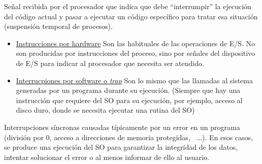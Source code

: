 \begin{definicion} [Interrupciones]
    Señal recibida por el procesador que indica que debe ``interrumpir'' la ejecución del código actual y pasar a ejecutar un código específico para tratar esa situación (suspensión temporal de procesos).
    \begin{itemize}
         \item \underline{Instrucciones por hardware} Son las habituales de las operaciones de E/S. No son producidas por instrucciones del proceso, sino por señales del dispositivo de E/S para indicar al procesador que necesita ser atendido.

         \item \underline{Interrucpiones por software o \emph{trap}} Son lo mismo que las llamadas al sistema generadas por un programa durante su ejecución. (Siempre que hay una instrucción que requiere del SO para su ejecución, por ejemplo, acceso al disco duro, donde se necesita ejecutar una rutina del SO)
    \end{itemize}
\end{definicion}

\begin{definicion} [Excepciones] Interrupciones síncronas causadas típicamente por un error en un programa (división por 0, acceso a direcciones de memoria protegidas,~ ...). En esos casos, se produce una ejecución del SO para garantizar la integridad de los datos, intentar solucionar el error o al menos informar de ello al usuario.
    
\end{definicion}